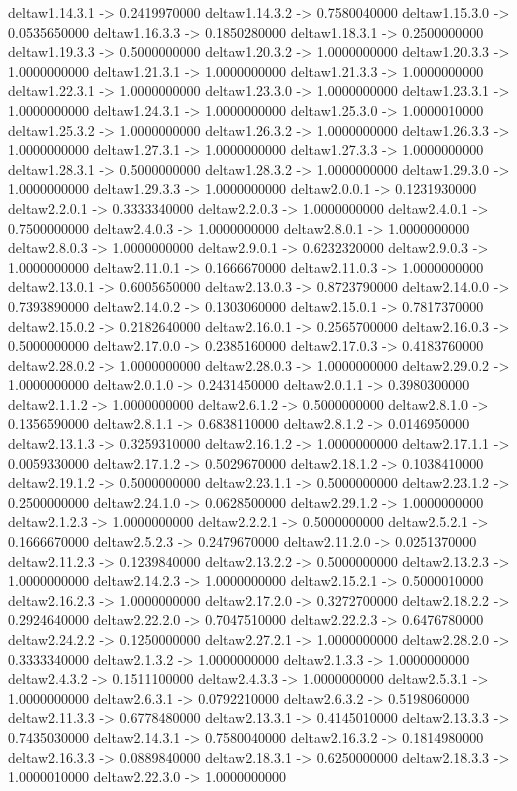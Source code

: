 deltaw1.14.3.1 -> 0.2419970000    deltaw1.14.3.2 -> 0.7580040000    deltaw1.15.3.0 -> 0.0535650000    deltaw1.16.3.3 -> 0.1850280000    deltaw1.18.3.1 -> 0.2500000000    deltaw1.19.3.3 -> 0.5000000000    deltaw1.20.3.2 -> 1.0000000000    deltaw1.20.3.3 -> 1.0000000000    deltaw1.21.3.1 -> 1.0000000000    deltaw1.21.3.3 -> 1.0000000000    deltaw1.22.3.1 -> 1.0000000000    deltaw1.23.3.0 -> 1.0000000000    deltaw1.23.3.1 -> 1.0000000000    deltaw1.24.3.1 -> 1.0000000000    deltaw1.25.3.0 -> 1.0000010000    deltaw1.25.3.2 -> 1.0000000000    deltaw1.26.3.2 -> 1.0000000000    deltaw1.26.3.3 -> 1.0000000000    deltaw1.27.3.1 -> 1.0000000000    deltaw1.27.3.3 -> 1.0000000000    deltaw1.28.3.1 -> 0.5000000000    deltaw1.28.3.2 -> 1.0000000000    deltaw1.29.3.0 -> 1.0000000000    deltaw1.29.3.3 -> 1.0000000000    deltaw2.0.0.1 -> 0.1231930000    deltaw2.2.0.1 -> 0.3333340000    deltaw2.2.0.3 -> 1.0000000000    deltaw2.4.0.1 -> 0.7500000000    deltaw2.4.0.3 -> 1.0000000000    deltaw2.8.0.1 -> 1.0000000000    deltaw2.8.0.3 -> 1.0000000000    deltaw2.9.0.1 -> 0.6232320000    deltaw2.9.0.3 -> 1.0000000000    deltaw2.11.0.1 -> 0.1666670000    deltaw2.11.0.3 -> 1.0000000000    deltaw2.13.0.1 -> 0.6005650000    deltaw2.13.0.3 -> 0.8723790000    deltaw2.14.0.0 -> 0.7393890000    deltaw2.14.0.2 -> 0.1303060000    deltaw2.15.0.1 -> 0.7817370000    deltaw2.15.0.2 -> 0.2182640000    deltaw2.16.0.1 -> 0.2565700000    deltaw2.16.0.3 -> 0.5000000000    deltaw2.17.0.0 -> 0.2385160000    deltaw2.17.0.3 -> 0.4183760000    deltaw2.28.0.2 -> 1.0000000000    deltaw2.28.0.3 -> 1.0000000000    deltaw2.29.0.2 -> 1.0000000000    deltaw2.0.1.0 -> 0.2431450000    deltaw2.0.1.1 -> 0.3980300000    deltaw2.1.1.2 -> 1.0000000000    deltaw2.6.1.2 -> 0.5000000000    deltaw2.8.1.0 -> 0.1356590000    deltaw2.8.1.1 -> 0.6838110000    deltaw2.8.1.2 -> 0.0146950000    deltaw2.13.1.3 -> 0.3259310000    deltaw2.16.1.2 -> 1.0000000000    deltaw2.17.1.1 -> 0.0059330000    deltaw2.17.1.2 -> 0.5029670000    deltaw2.18.1.2 -> 0.1038410000    deltaw2.19.1.2 -> 0.5000000000    deltaw2.23.1.1 -> 0.5000000000    deltaw2.23.1.2 -> 0.2500000000    deltaw2.24.1.0 -> 0.0628500000    deltaw2.29.1.2 -> 1.0000000000    deltaw2.1.2.3 -> 1.0000000000    deltaw2.2.2.1 -> 0.5000000000    deltaw2.5.2.1 -> 0.1666670000    deltaw2.5.2.3 -> 0.2479670000    deltaw2.11.2.0 -> 0.0251370000    deltaw2.11.2.3 -> 0.1239840000    deltaw2.13.2.2 -> 0.5000000000    deltaw2.13.2.3 -> 1.0000000000    deltaw2.14.2.3 -> 1.0000000000    deltaw2.15.2.1 -> 0.5000010000    deltaw2.16.2.3 -> 1.0000000000    deltaw2.17.2.0 -> 0.3272700000    deltaw2.18.2.2 -> 0.2924640000    deltaw2.22.2.0 -> 0.7047510000    deltaw2.22.2.3 -> 0.6476780000    deltaw2.24.2.2 -> 0.1250000000    deltaw2.27.2.1 -> 1.0000000000    deltaw2.28.2.0 -> 0.3333340000    deltaw2.1.3.2 -> 1.0000000000    deltaw2.1.3.3 -> 1.0000000000    deltaw2.4.3.2 -> 0.1511100000    deltaw2.4.3.3 -> 1.0000000000    deltaw2.5.3.1 -> 1.0000000000    deltaw2.6.3.1 -> 0.0792210000    deltaw2.6.3.2 -> 0.5198060000    deltaw2.11.3.3 -> 0.6778480000    deltaw2.13.3.1 -> 0.4145010000    deltaw2.13.3.3 -> 0.7435030000    deltaw2.14.3.1 -> 0.7580040000    deltaw2.16.3.2 -> 0.1814980000    deltaw2.16.3.3 -> 0.0889840000    deltaw2.18.3.1 -> 0.6250000000    deltaw2.18.3.3 -> 1.0000010000    deltaw2.22.3.0 -> 1.0000000000 